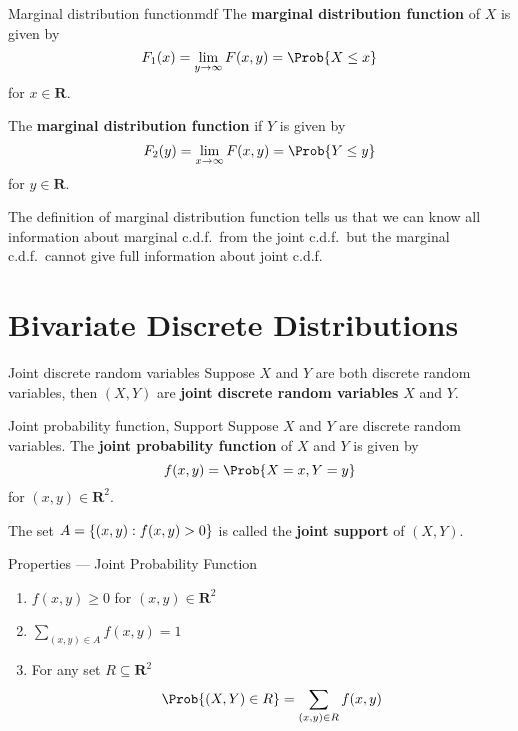\begin{Definition}{Marginal distribution function}{mdf}
    The \textbf{marginal distribution function} of $ X $ is given by
    \[ F_1(x)=\lim\limits_{{y} \to {\infty}} F(x,y)=\Prob{X\le x} \]
    for $ x\in\mathbf{R} $.

    The \textbf{marginal distribution function} if $ Y $ is given by
    \[ F_2(y)=\lim\limits_{{x} \to {\infty}} F(x,y)=\Prob{Y\le y} \]
    for $ y\in\mathbf{R} $.
\end{Definition}
\begin{Remark}{}{}
    The definition of marginal distribution
    function tells us that we can know all information
    about marginal c.d.f.\ from the joint c.d.f.\ but the
    marginal c.d.f.\ cannot give full information about
    joint c.d.f.\
\end{Remark}
\section{Bivariate Discrete Distributions}
\begin{Definition}{Joint discrete random variables}{}
    Suppose $ X $ and $ Y $ are both discrete random variables,
    then $ (X,Y) $ are \textbf{joint discrete random variables}
    $ X $ and $ Y $.
\end{Definition}

\begin{Definition}{Joint probability function, Support}{}
    Suppose $ X $ and $ Y $ are discrete random variables.
    The \textbf{joint probability function} of $ X $ and $ Y $
    is given by
    \[ f(x,y)=\Prob{X=x,Y=y} \]
    for $ (x,y)\in\mathbf{R}^2 $.

    The set $ A=\{(x,y):f(x,y)>0\} $ is called
    the \textbf{joint support} of $ (X,Y) $.
\end{Definition}

\begin{Definition}{Properties --- Joint Probability Function}{}
    \begin{enumerate}[label=(\Roman*)]
        \item $ f(x,y)\ge 0 $ for $ (x,y)\in\mathbf{R}^2 $
        \item $ \displaystyle \sum\limits_{(x,y)\in A}
                  f(x,y)=1 $
        \item For any set $ R\subseteq \mathbf{R}^2 $
              \[ \Prob{(X,Y)\in R}
                  =\sum\limits_{(x,y)\in R}f(x,y)  \]
    \end{enumerate}
\end{Definition}

